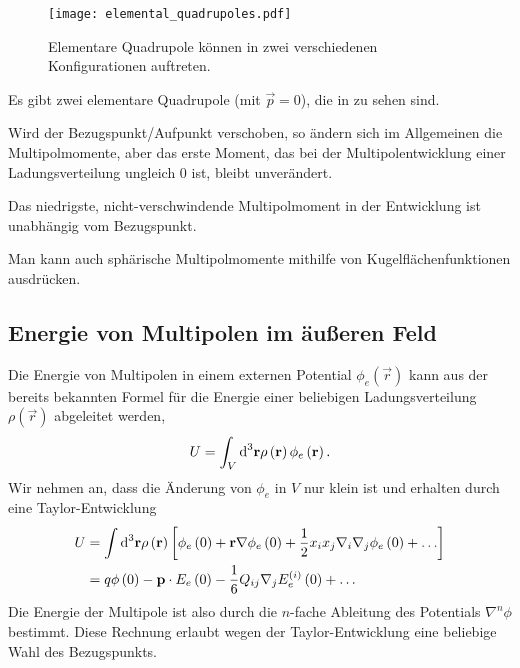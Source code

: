 \begin{enumerate}
		\begin{figure}[htb]
			\centering
			\texttt{[image: elemental\_quadrupoles.pdf]}
			\caption{Elementare Quadrupole können in zwei verschiedenen Konfigurationen auftreten. }
			\label{fig:elemental_quadrupoles}
		\end{figure}

		Es gibt zwei elementare Quadrupole (mit $\vec {p}=0$), die in  zu sehen sind. 

		Wird der Bezugspunkt/Aufpunkt verschoben, so ändern sich im Allgemeinen die Multipolmomente, aber das erste Moment, das bei der Multipolentwicklung einer Ladungsverteilung ungleich $0$ ist, bleibt unverändert.


		\begin{formal}
			Das niedrigste, nicht-verschwindende Multipolmoment in der Entwicklung ist unabhängig vom Bezugspunkt.
		\end{formal}
		Man kann auch sphärische Multipolmomente mithilfe von Kugelflächenfunktionen ausdrücken.
\end{enumerate}


\subsection{Energie von Multipolen im äußeren Feld}

Die Energie von Multipolen in einem externen Potential $\phi _{e}\left(\vec {r}\right)$ kann aus der bereits bekannten Formel für die Energie einer beliebigen Ladungsverteilung $\rho \left(\vec {r}\right)$ abgeleitet werden,
\begin{equation*}
	U=\int _{V}\text{d} ^{3}\mathbf{r}\rho \left(\mathbf{r}\right)\phi _{e}\left(\mathbf{r}\right).
\end{equation*}
Wir nehmen an, dass die Änderung von $\phi _{e}$ in $V$ nur klein ist und erhalten durch eine Taylor-Entwicklung
\begin{align*}
	U&=\int \text{d} ^{3}\mathbf{r}\rho \left(\mathbf{r}\right)\left[\phi _{e}\left(0\right)+\mathbf{r}\nabla \phi _{e}\left(0\right)+\frac{1}{2}x_{i}x_{j}\nabla _{i}\nabla _{j}\phi _{e}\left(0\right)+\ldots \right]\\&=q\phi \left(0\right)-\mathbf{p}\cdot E_{e}\left(0\right)-\frac{1}{6}Q_{ij}\nabla _{j}E_{e}^{\left(i\right)}\left(0\right)+\ldots
\end{align*}
Die Energie der Multipole ist also durch die $n$-fache Ableitung des Potentials $\nabla ^{n}\phi $ bestimmt. Diese Rechnung erlaubt wegen der Taylor-Entwicklung eine beliebige Wahl des Bezugspunkts.

